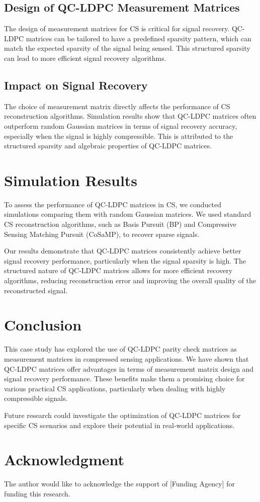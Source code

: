 \documentclass[journal]{IEEEtran}
\begin{document}
\subsection{Design of QC-LDPC Measurement Matrices}
\label{subsec:design}
The design of measurement matrices for CS is critical for signal recovery. QC-LDPC matrices can be tailored to have a predefined sparsity pattern, which can match the expected sparsity of the signal being sensed. This structured sparsity can lead to more efficient signal recovery algorithms.

\subsection{Impact on Signal Recovery}
\label{subsec:impact}
The choice of measurement matrix directly affects the performance of CS reconstruction algorithms. Simulation results show that QC-LDPC matrices often outperform random Gaussian matrices in terms of signal recovery accuracy, especially when the signal is highly compressible. This is attributed to the structured sparsity and algebraic properties of QC-LDPC matrices.

\section{Simulation Results}
\label{sec:results}
To assess the performance of QC-LDPC matrices in CS, we conducted simulations comparing them with random Gaussian matrices. We used standard CS reconstruction algorithms, such as Basis Pursuit (BP) and Compressive Sensing Matching Pursuit (CoSaMP), to recover sparse signals.

Our results demonstrate that QC-LDPC matrices consistently achieve better signal recovery performance, particularly when the signal sparsity is high. The structured nature of QC-LDPC matrices allows for more efficient recovery algorithms, reducing reconstruction error and improving the overall quality of the reconstructed signal.

\section{Conclusion}
\label{sec:conclusion}
This case study has explored the use of QC-LDPC parity check matrices as measurement matrices in compressed sensing applications. We have shown that QC-LDPC matrices offer advantages in terms of measurement matrix design and signal recovery performance. These benefits make them a promising choice for various practical CS applications, particularly when dealing with highly compressible signals.

Future research could investigate the optimization of QC-LDPC matrices for specific CS scenarios and explore their potential in real-world applications.

\section*{Acknowledgment}
The author would like to acknowledge the support of [Funding Agency] for funding this research.



\end{document}
